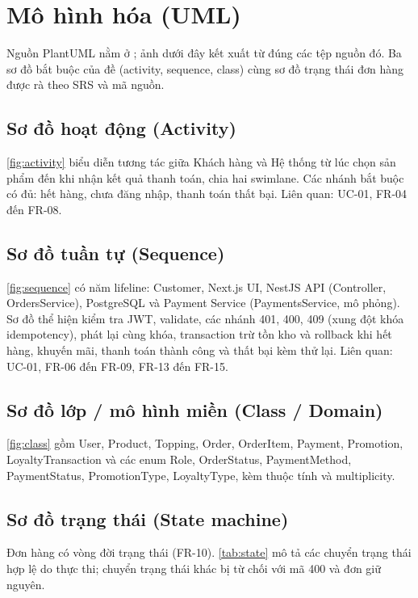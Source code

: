 \chapter{Mô hình hóa (UML)}\label{ch:mohinh}
Nguồn PlantUML nằm ở ; ảnh dưới đây kết xuất từ đúng các tệp nguồn đó. Ba sơ đồ bắt buộc của đề (activity, sequence, class) cùng sơ đồ trạng thái đơn hàng được rà theo SRS và mã nguồn.

\section{Sơ đồ hoạt động (Activity)}\label{sec:se-activity}
\cref{fig:activity} biểu diễn tương tác giữa Khách hàng và Hệ thống từ lúc chọn sản phẩm đến khi nhận kết quả thanh toán, chia hai swimlane. Các nhánh bắt buộc có đủ: hết hàng, chưa đăng nhập, thanh toán thất bại. Liên quan: UC-01, FR-04 đến FR-08.

\section{Sơ đồ tuần tự (Sequence)}\label{sec:se-sequence}
\cref{fig:sequence} có năm lifeline: Customer, Next.js UI, NestJS API (Controller, OrdersService), PostgreSQL và Payment Service (PaymentsService, mô phỏng). Sơ đồ thể hiện kiểm tra JWT, validate, các nhánh 401, 400, 409 (xung đột khóa idempotency), phát lại cùng khóa, transaction trừ tồn kho và rollback khi hết hàng, khuyến mãi, thanh toán thành công và thất bại kèm thử lại. Liên quan: UC-01, FR-06 đến FR-09, FR-13 đến FR-15.

\section{Sơ đồ lớp / mô hình miền (Class / Domain)}\label{sec:se-class}
\cref{fig:class} gồm User, Product, Topping, Order, OrderItem, Payment, Promotion, LoyaltyTransaction và các enum Role, OrderStatus, PaymentMethod, PaymentStatus, PromotionType, LoyaltyType, kèm thuộc tính và multiplicity.

\section{Sơ đồ trạng thái (State machine)}\label{sec:se-state}
Đơn hàng có vòng đời trạng thái (FR-10). \cref{tab:state} mô tả các chuyển trạng thái hợp lệ do  thực thi; chuyển trạng thái khác bị từ chối với mã 400 và đơn giữ nguyên.

